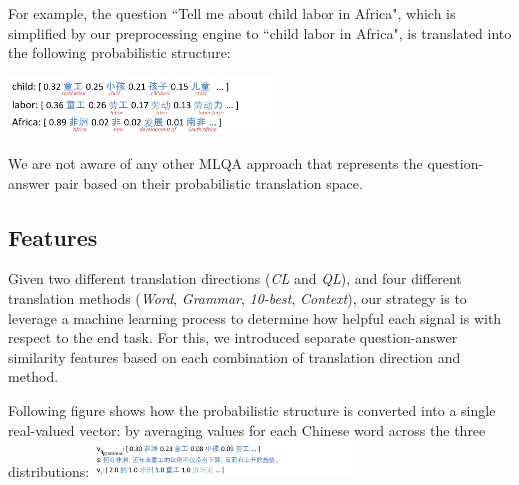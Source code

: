 \documentclass{sig-alternate-05-2015}
\newcommand{\red}[1]{\textcolor{red}{#1}}
\begin{document}
\vspace{-0.25cm}
For example, the question ``Tell me about child 
labor in Africa", which is simplified by our preprocessing engine to ``child labor in Africa", is translated into the following 
probabilistic structure:

\includegraphics[width=7cm]{example.pdf}

We are not aware of any other MLQA approach that represents the question-answer pair based on their probabilistic translation
space.
 
\subsection{Features}\label{sec:feat}


Given two different translation directions (\emph{CL} and \emph{QL}), and four different translation methods (\emph{Word}, 
\emph{Grammar}, \emph{10-best}, \emph{Context}), our strategy is to leverage a machine learning process to determine how 
helpful each signal is with respect to the end task. For this, we introduced separate question-answer similarity features based 
on each combination of translation direction and method. 

Following figure shows how the probabilistic structure is converted into a single real-valued vector:
by averaging values for each Chinese word across the three distributions:
\includegraphics[width=7cm]{example2.pdf}
\end{document}
